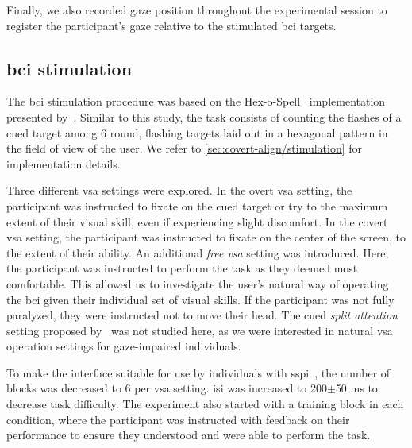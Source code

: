 Finally, we also recorded gaze position throughout the experimental session to
register the participant's gaze relative to the stimulated \ac{bci} targets.

\subsection{\Acs{bci} stimulation}

The \ac{bci} stimulation procedure was based on the
Hex-o-Spell~\cite{Treder2010} implementation presented
by~\textcite{VanDenKerchove2024}.
Similar to this study, the task consists of counting the flashes of a cued
target among 6 round, flashing targets laid out in a hexagonal pattern in the
field of view of the user.
We refer to \cref{sec:covert-align/stimulation} for implementation details.

Three different \ac{vsa} settings were explored.
In the overt \ac{vsa} setting, the participant was instructed to fixate on the cued target or
try to the maximum extent of their visual skill, even if experiencing slight
discomfort.
In the covert \ac{vsa} setting, the participant was instructed to fixate on the center of the
screen, to the extent of their ability.
An additional \emph{free \ac{vsa}} setting was introduced.
Here, the participant was instructed to perform the task as they deemed most
comfortable.
This allowed us to investigate the user's natural way of operating the \ac{bci}
given their individual set of visual skills.
If the participant was not fully paralyzed, they were instructed not to move their head.
The cued \emph{split attention} setting proposed
by~\textcite{VanDenKerchove2024} was not studied here, as we were interested
in natural \ac{vsa} operation settings for gaze-impaired individuals.

To make the interface suitable for use by individuals with
\ac{sspi}~\cite{FriedOken2020}, the
number of blocks was decreased to 6 per \ac{vsa} setting.
\Ac{isi} was increased to 200$\pm$50 ms to decrease task difficulty.
The experiment also started with a training block in each condition, where the
participant was instructed with feedback on their performance to ensure they
understood and were able to perform the task.

